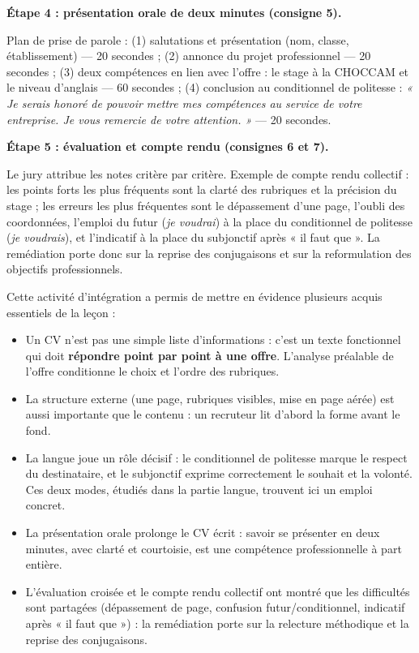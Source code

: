 \documentclass[11pt]{article}
\newcommand{\cle}[1]{{\popxbold\color{popdark}#1}}
\newcounter{popsec}
\newcounter{popsub}
\newcommand{\courssub}[1]{%
  \stepcounter{popsub}%
  \par\vspace{9pt}\noindent{\popxbold\fontsize{11.5}{13}\selectfont\color{popink}{\color{poporange}\thepopsec.\thepopsub}\hspace{6pt}#1}\par\nopagebreak\vspace{4pt}
}
\begin{document}
\begin{exoresolu}
\textbf{Étape 4 : présentation orale de deux minutes (consigne 5).}

Plan de prise de parole : (1) salutations et présentation (nom, classe, établissement) — 20 secondes ; (2) annonce du projet professionnel — 20 secondes ; (3) deux compétences en lien avec l'offre : le stage à la CHOCCAM et le niveau d'anglais — 60 secondes ; (4) conclusion au conditionnel de politesse : \emph{« Je serais honoré de pouvoir mettre mes compétences au service de votre entreprise. Je vous remercie de votre attention. »} — 20 secondes.

\textbf{Étape 5 : évaluation et compte rendu (consignes 6 et 7).}

Le jury attribue les notes critère par critère. Exemple de compte rendu collectif : les points forts les plus fréquents sont la clarté des rubriques et la précision du stage ; les erreurs les plus fréquentes sont le dépassement d'une page, l'oubli des coordonnées, l'emploi du futur (\emph{je voudrai}) à la place du conditionnel de politesse (\emph{je voudrais}), et l'indicatif à la place du subjonctif après « il faut que ». La remédiation porte donc sur la reprise des conjugaisons et sur la reformulation des objectifs professionnels.
\end{exoresolu}

\courssub{Bilan de l'activité}

Cette activité d'intégration a permis de mettre en évidence plusieurs acquis essentiels de la leçon :

\begin{itemize}
\item Un CV n'est pas une simple liste d'informations : c'est un \cle{texte fonctionnel} qui doit \textbf{répondre point par point à une offre}. L'analyse préalable de l'offre conditionne le choix et l'ordre des rubriques.
\item La \cle{structure externe} (une page, rubriques visibles, mise en page aérée) est aussi importante que le contenu : un recruteur lit d'abord la forme avant le fond.
\item La langue joue un rôle décisif : le \cle{conditionnel de politesse} marque le respect du destinataire, et le \cle{subjonctif} exprime correctement le souhait et la volonté. Ces deux modes, étudiés dans la partie langue, trouvent ici un emploi concret.
\item La présentation orale prolonge le CV écrit : savoir se présenter en deux minutes, avec clarté et courtoisie, est une compétence professionnelle à part entière.
\item L'évaluation croisée et le compte rendu collectif ont montré que les difficultés sont partagées (dépassement de page, confusion futur/conditionnel, indicatif après « il faut que ») : la remédiation porte sur la relecture méthodique et la reprise des conjugaisons.
\end{itemize}
\end{document}
